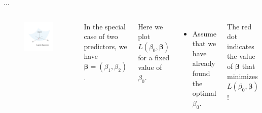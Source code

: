 \documentclass[8pt]{beamer}
\newcommand{\mys}{\vspace{0.5cm} \pause
}
\begin{document}
\begin{frame}{\color{white} $\ldots$}

\begin{columns}

\begin{figure}
    \centering
    \includegraphics[trim = 50 75 25 75, clip, width = \textwidth]{min_nll.pdf}
\end{figure}


In the special case of two predictors, we have $\bm{\beta} = (\beta_1, \beta_2)$. \mys

Here we plot $L(\beta_0, \bm{\beta})$ for a fixed value of $\beta_0$.
\begin{itemize}
    \item Assume that we have already found the optimal $\beta_0$.
\end{itemize} \mys

The red dot indicates the value of $\bm{\beta}$ that minimizes $L(\beta_0, \bm{\beta})$!
    
\end{columns}
    
\end{frame}
\end{document}
